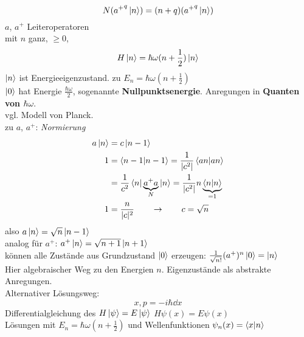 $$N ({a^+}^q \ket{n}) = (n + q) ({a^+}^q \ket{n})$$
$a$, $a^+$ Leiteroperatoren\\
mit $n$ ganz, $\geq 0$,
$$H \ket{n} = \hbar \omega (n +\frac12) \ket{n}$$
$\ket{n}$ ist Energieeigenzustand.
zu $E_n = \hbar \omega (n + \frac12)$\\
$\ket{0}$ hat Energie $\frac{\hbar \omega}{2}$, sogenannte \textbf{Nullpunktsenergie}.
Anregungen in \textbf{Quanten von $\hbar \omega$}.\\
vgl. Modell von Planck.\\
zu $a$, $a^+$: \textit{Normierung}
\begin{align*}
a \ket{n} &= c \ket{n - 1}\\
1 &= \braket{n - 1 | n - 1} = \frac{1}{|c^2|} \braket{a n | a n}\\
&= \frac{1}{c^2} \braket{n | \underbrace{a^+ a}_N | n} = \frac{1}{|c^2|} n \underbrace{\braket{n | n}}_{= 1}\\
1 &= \frac{n}{|c|^2} \qquad \rightarrow \qquad c = \sqrt{n}
\end{align*}
also $a \ket{n} = \sqrt{n} \ket{n - 1}$\\
analog für $a^+$: $a^+ \ket{n} = \sqrt{n + 1} \ket{n + 1}$\\
können alle Zustände aus Grundzustand $\ket{0}$ erzeugen: \conseq $\frac{1}{\sqrt{n!}} (a^+)^n \ket{0} = \ket{n}$\\
Hier algebraischer Weg zu den Energien $n$. Eigenzustände als abstrakte Anregungen.\\
Alternativer Lösungsweg:
$$x, p = - i \hbar \dd{x}$$
\conseq Differentialgleichung des $H \ket{\psi} = E \ket{\psi}$ \conseq $H \psi(x) = E \psi(x)$\\
Lösungen mit $E_n = \hbar \omega (n + \frac12)$ und Wellenfunktionen $\psi_n(x) = \braket{x | n}$


